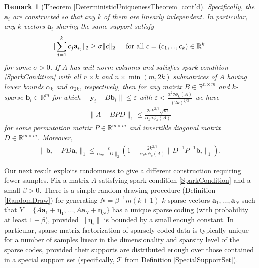 \documentclass[journal, onecolumn]{IEEEtran}
\newtheorem{remark}{Remark}
\begin{document}
\begin{remark}[Theorem \ref{DeterministicUniquenessTheorem} cont'd]
Specifically, the $\mathbf{a}_i$ are constructed so that any $k$ of them are linearly independent. In particular, any $k$ vectors $\mathbf{a}_i$ sharing the same support satisfy
\begin{align}\label{DataSpread}
\|\sum_{j = 1}^k c_j \mathbf{a}_{i_j}\|_2 \geq \sigma \|c\|_2 \indent \text{for all } c = (c_1, ..., c_k) \in \mathbb{R}^k.
\end{align}
%
for some $\sigma > 0$. If $A$ has unit norm columns and satisfies spark condition \eqref{SparkCondition} with all $n \times k$ and $n \times \min(m,2k)$ submatrices of $A$ having lower bounds $\alpha_k$ and $\alpha_{2k}$, respectively, then for any matrix $B \in \mathbb{R}^{n \times m}$ and $k$-sparse $\mathbf{b}_i \in \mathbb{R}^m$ for which $\|\mathbf{y}_i - B\mathbf{b}_i\| \leq \varepsilon$ with $\varepsilon < \frac{\alpha^2\sigma\phi_k(A)}{(2k)^{2/3}}$ we have
\begin{align}
\|A - BPD\|_1 \leq \frac{2\varepsilon k^{2/3}\sqrt{m} }{\alpha_k\sigma \phi_k(A)}
\end{align}
%
for some permutation matrix $P \in \mathbb{R}^{m \times m}$ and invertible diagonal matrix $D \in \mathbb{R}^{m \times m}$. Moreover, 
\begin{align}\label{b_PDa}
\|\mathbf{b}_i - PD\mathbf{a}_i\|_1 \leq \frac{\varepsilon}{\alpha_{2k}\|D\|_2}  \left( 1 + \frac{2 k^{2/3}}{\alpha_k\sigma \phi_k(A)}\|D^{-1}P^{-1}\mathbf{b}_i\|_1 \right).
\end{align}
\end{remark}

Our next result exploits randomness to give a different construction requiring fewer samples. Fix a matrix $A$ satisfying spark condition \eqref{SparkCondition} and a small $\beta > 0$. There is a simple random drawing procedure (Definition \ref{RandomDraw}) for generating $N = \beta^{-1}m(k+1)$ $k$-sparse vectors $\mathbf{a}_1, \ldots, \mathbf{a}_N$ such that $Y = \{A\mathbf{a}_1 + \mathbf{\eta}_1, \ldots, A\mathbf{a}_N + \mathbf{\eta}_N\}$ has a unique sparse coding (with probability at least $1 - \beta$), provided $\|\mathbf{\eta}_i\|$ is bounded by a small enough constant. In particular, sparse matrix factorization of sparsely coded data is typically unique for a number of samples linear in the dimensionality and sparsity level of the sparse codes, provided their supports are distributed enough over those contained in a special support set (specifically, $\mathcal{T}$ from Definition \ref{SpecialSupportSet}).
\end{document}
